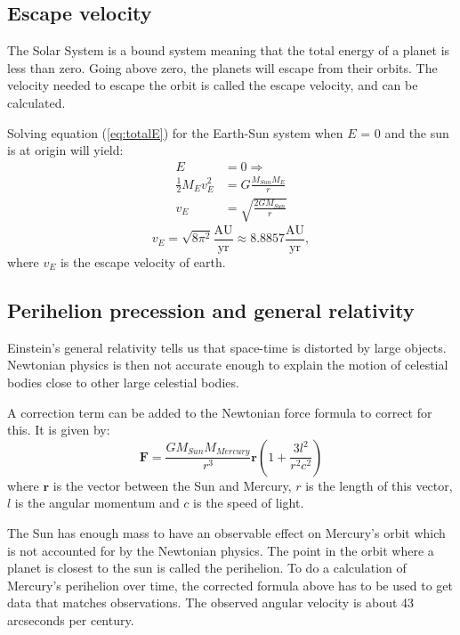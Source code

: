 \documentclass[10pt,a4paper,titlepage]{article}
\begin{document}
\subsection{Escape velocity}
The Solar System is a bound system meaning that the total energy of a planet is less than zero. Going above zero, the planets will escape from their orbits. The velocity needed to escape the orbit is called the escape velocity, and can be calculated. 

Solving equation (\ref{eq:totalE}) for the Earth-Sun system when $E$ = 0 and the sun is at origin will yield:
\begin{align*}
E &= 0 \Rightarrow \\
\frac{1}{2}M_{E}v^2_{E} &= G\frac{M_{Sun}M_{E}}{r} \\
v_{E} &= \sqrt{\frac{2GM_{Sun}}{r}} 
\end{align*}
\begin{equation}
v_{E} = \sqrt{8\pi^{2}} \mathrm{\frac{AU}{yr}} \approx 8.8857 \mathrm{\frac{AU}{yr}},
\end{equation}
where $v_{E}$ is the escape velocity of earth. 

\subsection{Perihelion precession and general relativity}
Einstein's general relativity tells us that space-time is distorted by large objects. Newtonian physics is then not accurate enough to explain the motion of celestial bodies close to other large celestial bodies. 

A correction term can be added to the Newtonian force formula to correct for this. It is given by:
\begin{equation}
\mathbf{F}=\frac{GM_{Sun}M_{Mercury}}{r^3}\mathbf{r}\left(1+\frac{3l^2}{r^2c^2}\right)
\end{equation}
where $\mathbf{r}$ is the vector between the Sun and Mercury, $r$ is the length of this vector, $l$ is the angular momentum and $c$ is the speed of light. 

The Sun has enough mass to have an observable effect on Mercury's orbit which is not accounted for by the Newtonian physics. The point in the orbit where a planet is closest to the sun is called the perihelion. To do a calculation of Mercury's perihelion over time, the corrected formula above has to be used to get data that matches observations. The observed angular velocity is about 43 arcseconds per century. 
\end{document}
